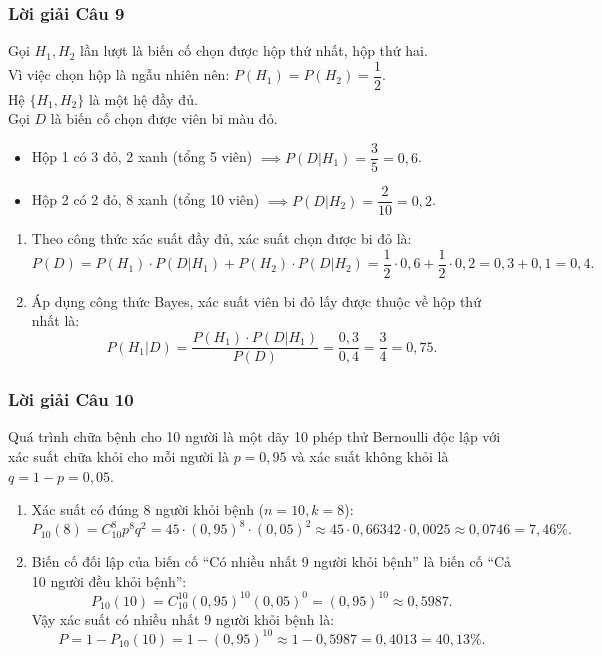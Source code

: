 \subsubsection*{Lời giải Câu 9}
Gọi $H_1, H_2$ lần lượt là biến cố chọn được hộp thứ nhất, hộp thứ hai.\\
Vì việc chọn hộp là ngẫu nhiên nên: $P(H_1) = P(H_2) = \dfrac{1}{2}$.\\
Hệ $\{H_1, H_2\}$ là một hệ đầy đủ.\\
Gọi $D$ là biến cố chọn được viên bi màu đỏ.
\begin{itemize}
    \item Hộp 1 có 3 đỏ, 2 xanh (tổng 5 viên) $\implies P(D|H_1) = \dfrac{3}{5} = 0{,}6$.
    \item Hộp 2 có 2 đỏ, 8 xanh (tổng 10 viên) $\implies P(D|H_2) = \dfrac{2}{10} = 0{,}2$.
\end{itemize}
\begin{enumerate}[label=\arabic*.]
    \item Theo công thức xác suất đầy đủ, xác suất chọn được bi đỏ là:
    \[
    P(D) = P(H_1) \cdot P(D|H_1) + P(H_2) \cdot P(D|H_2) = \frac{1}{2} \cdot 0{,}6 + \frac{1}{2} \cdot 0{,}2 = 0{,}3 + 0{,}1 = 0{,}4.
    \]
    \item Áp dụng công thức Bayes, xác suất viên bi đỏ lấy được thuộc về hộp thứ nhất là:
    \[
    P(H_1|D) = \frac{P(H_1) \cdot P(D|H_1)}{P(D)} = \frac{0{,}3}{0{,}4} = \frac{3}{4} = 0{,}75.
    \]
\end{enumerate}

\subsubsection*{Lời giải Câu 10}
Quá trình chữa bệnh cho 10 người là một dãy 10 phép thử Bernoulli độc lập với xác suất chữa khỏi cho mỗi người là $p = 0{,}95$ và xác suất không khỏi là $q = 1 - p = 0{,}05$.
\begin{enumerate}[label=\alph*)]
    \item Xác suất có đúng 8 người khỏi bệnh ($n = 10, k = 8$):
    \[
    P_{10}(8) = C_{10}^8 p^8 q^2 = 45 \cdot (0{,}95)^8 \cdot (0{,}05)^2 \approx 45 \cdot 0{,}66342 \cdot 0{,}0025 \approx 0{,}0746 = 7{,}46\%.
    \]
    \item Biến cố đối lập của biến cố ``Có nhiều nhất 9 người khỏi bệnh'' là biến cố ``Cả 10 người đều khỏi bệnh'':
    \[
    P_{10}(10) = C_{10}^{10} (0{,}95)^{10} (0{,}05)^0 = (0{,}95)^{10} \approx 0{,}5987.
    \]
    Vậy xác suất có nhiều nhất 9 người khỏi bệnh là:
    \[
    P = 1 - P_{10}(10) = 1 - (0{,}95)^{10} \approx 1 - 0{,}5987 = 0{,}4013 = 40{,}13\%.
    \]
\end{enumerate}

